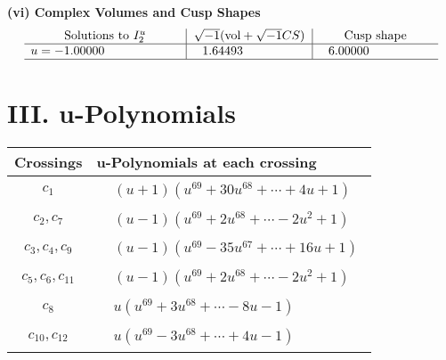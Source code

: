 \documentclass[1p]{elsarticle_modified}
\theoremstyle{definition}
\newcommand{\I}{\sqrt{-1}}
\begin{document}
\newpage\flushleft \textbf{(vi) Complex Volumes and Cusp Shapes}
$$\begin{array}{c|c|c}  
\text{Solutions to }I^u_{2}& \I (\text{vol} + \sqrt{-1}CS) & \text{Cusp shape}\\
 \hline 
\begin{aligned}
u &= -1.00000\phantom{ +0.000000I}\end{aligned}
 & \phantom{-}1.64493\phantom{ +0.000000I} & \phantom{-}6.00000\phantom{ +0.000000I}\\
 \hline 
 \end{array}$$\newpage
\newpage\renewcommand{\arraystretch}{1}
\centering \section*{ III. u-Polynomials}
\begin{tabular}{m{50pt}|m{274pt}}
Crossings & \hspace{64pt}u-Polynomials at each crossing \\
\hline $$\begin{aligned}c_{1}\end{aligned}$$&$\begin{aligned}
&(u+1)(u^{69}+30 u^{68}+\cdots+4 u+1)
\end{aligned}$\\
\hline $$\begin{aligned}c_{2},c_{7}\end{aligned}$$&$\begin{aligned}
&(u-1)(u^{69}+2 u^{68}+\cdots-2 u^2+1)
\end{aligned}$\\
\hline $$\begin{aligned}c_{3},c_{4},c_{9}\end{aligned}$$&$\begin{aligned}
&(u-1)(u^{69}-35 u^{67}+\cdots+16 u+1)
\end{aligned}$\\
\hline $$\begin{aligned}c_{5},c_{6},c_{11}\end{aligned}$$&$\begin{aligned}
&(u-1)(u^{69}+2 u^{68}+\cdots-2 u^2+1)
\end{aligned}$\\
\hline $$\begin{aligned}c_{8}\end{aligned}$$&$\begin{aligned}
&u(u^{69}+3 u^{68}+\cdots-8 u-1)
\end{aligned}$\\
\hline $$\begin{aligned}c_{10},c_{12}\end{aligned}$$&$\begin{aligned}
&u(u^{69}-3 u^{68}+\cdots+4 u-1)
\end{aligned}$\\
\hline
\end{tabular}\newpage\renewcommand{\arraystretch}{1}
\end{document}
